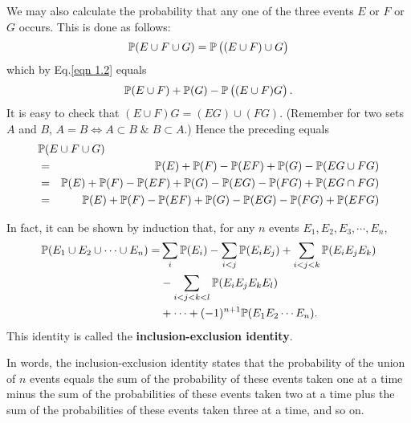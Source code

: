 We may also calculate the probability that any one of the three events $E$ or $F$ or $G$ occurs. This is done as follows:
\begin{equation*}
    \mathbb{P}( E \cup F \cup G) = \mathbb{P} \left( (E \cup F) \cup G\right) 
\end{equation*}
which by Eq.\eqref{eqn 1.2} equals
\begin{equation*}
    \mathbb{P} (E \cup F) + \mathbb{P}(G) - \mathbb{P} \left( (E \cup F) G \right).
\end{equation*}
It is easy to check that $(E \cup F) G  = (EG) \cup (FG)$. (Remember for two sets $A$ and $B$, $A = B \iff A \subset B \; \& \; B \subset A$.) Hence the preceding equals 
\begin{eqnarray}
    \lefteqn{\Prob(E \cup F \cup G)} \notag \\ 
    & = & \Prob(E) + \Prob(F) - \Prob(EF) + \Prob(G) - \Prob(EG \cup FG) \notag \\ 
    & = & \Prob(E) + \Prob(F) - \Prob(EF) + \Prob(G) - \Prob (EG) - \Prob (FG) + \Prob(EG \cap FG) \notag \\ 
    & = & \Prob(E) + \Prob(F) - \Prob(EF) + \Prob(G) - \Prob (EG) - \Prob (FG) + \Prob(EFG) \label{eqn 1.3}
\end{eqnarray}

\begin{proposition}
    In fact, it can be shown by induction that, for any $n$ events $E_1, E_2,E_3, \cdots, E_n$, 
    \begin{align}
        \mathbb{P} (E_1 \cup E_2 \cup \cdots \cup E_n) = & \sum_{i} \mathbb{P} (E_i) - \sum_{i < j} \mathbb{P} (E_i E_j) + \sum_{i < j < k} \mathbb{P} (E_i E_j E_k) \notag \\ 
        & - \sum_{i < j < k < l} \mathbb{P} (E_i E_j E_k E_l) \notag \\ 
        & + \cdots + (-1)^{n+1}  \mathbb{P} (E_1 E_2 \cdots E_n). \label{eqn 1.4}
    \end{align}
    This identity is called the \textbf{inclusion-exclusion identity}.
\end{proposition}

\begin{remark}
    In words, the inclusion-exclusion identity states that the probability of the union of $n$ events equals the sum of the probability of these events taken one at a time minus the sum of the probabilities of these events taken two at a time plus the sum of the probabilities of these events taken three at a time, and so on.
\end{remark}
